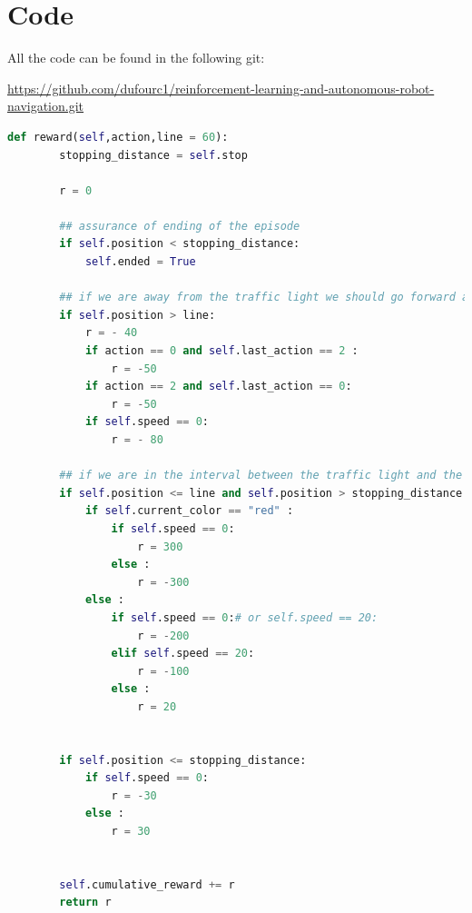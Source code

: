 \documentclass[14pt,a4paper]{article}
\theoremstyle{definition}
\begin{document}
\section{Code} \label{code}

All the code can be found in the following git: 

 \url{https://github.com/dufourc1/reinforcement-learning-and-autonomous-robot-navigation.git}

\lstlistoflistings
\vspace{1cm}


\begin{lstlisting}[language=Python, caption=Reward Function used in this project]
    def reward(self,action,line = 60):
        stopping_distance = self.stop

        r = 0

        ## assurance of ending of the episode
        if self.position < stopping_distance:
            self.ended = True

        ## if we are away from the traffic light we should go forward and no stop
        if self.position > line:
            r = - 40
            if action == 0 and self.last_action == 2 :
                r = -50
            if action == 2 and self.last_action == 0:
                r = -50
            if self.speed == 0:
                r = - 80

        ## if we are in the interval between the traffic light and the line we should respect the traffic light
        if self.position <= line and self.position > stopping_distance:
            if self.current_color == "red" :
                if self.speed == 0:
                    r = 300
                else :
                    r = -300
            else :
                if self.speed == 0:# or self.speed == 20:
                    r = -200
                elif self.speed == 20:
                    r = -100
                else :
                    r = 20


        if self.position <= stopping_distance:
            if self.speed == 0:
                r = -30
            else :
                r = 30


        self.cumulative_reward += r
        return r
\end{lstlisting}










\nocite{Watkins_phd}
\newpage
{}




\end{document}
